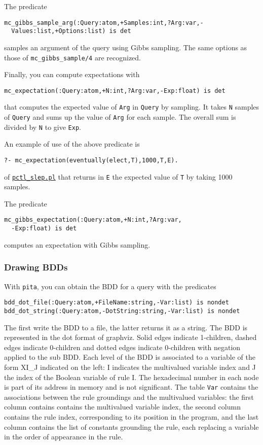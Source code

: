 The predicate
\begin{verbatim}
mc_gibbs_sample_arg(:Query:atom,+Samples:int,?Arg:var,-
  Values:list,+Options:list) is det
\end{verbatim}
samples an argument of the query using Gibbs sampling. The same options as those of \verb|mc_gibbs_sample/4| are
recognized.

Finally, you can compute expectations with
\begin{verbatim}
mc_expectation(:Query:atom,+N:int,?Arg:var,-Exp:float) is det
\end{verbatim}
that computes the expected value of \verb|Arg| in \verb|Query| by
sampling.
It takes \verb|N| samples of \verb|Query| and sums up the value of \verb|Arg| for
each sample. The overall sum is divided by \verb|N| to give \verb|Exp|.

An example of use of the above predicate is
\begin{verbatim}
?- mc_expectation(eventually(elect,T),1000,T,E).
\end{verbatim}
of \href{http://cplint.eu/e/pctl_slep.pl}{\texttt{pctl\_slep.pl}}
that returns in \verb|E| the expected value of \verb|T| by taking 1000 samples.

The predicate
\begin{verbatim}
mc_gibbs_expectation(:Query:atom,+N:int,?Arg:var,
  -Exp:float) is det
\end{verbatim}
computes an expectation with Gibbs sampling.

\subsubsection{Drawing BDDs}

With \verb|pita|, you can obtain the BDD for a query with the predicates
\begin{verbatim}
bdd_dot_file(:Query:atom,+FileName:string,-Var:list) is nondet
bdd_dot_string(:Query:atom,-DotString:string,-Var:list) is nondet
\end{verbatim}
The first write the BDD to a file, the latter returns it as a string.
The BDD is represented in the dot format of graphviz.
Solid edges indicate 1-children, dashed edges indicate 0-children and dotted
edges indicate 0-children with negation applied to the sub BDD.
Each level of the BDD is associated to a variable of the form XI\_J indicated on the left:
I indicates the multivalued variable index and J the index of the Boolean variable of rule I.
The hexadecimal number in each node is part of its address in memory and is not significant.
The table \verb|Var| contains the associations between the rule groundings and the
multivalued variables: the first column contains contains the multivalued variable index,
the second column contains the rule index, corresponding
to its position in the program, and the last column contains the list
of constants grounding the rule, each replacing a variable in the order of appearance in the
rule.

